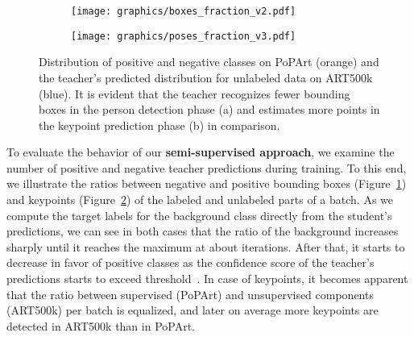 \documentclass[sigconf]{acmart}
\begin{document}
\begin{figure}
\centering
\begin{subfigure}{.49\linewidth}
  \centering
  \texttt{[image: graphics/boxes\_fraction\_v2.pdf]}
  \caption{}
  \label{fig:distribution-boxes}
\end{subfigure}\hfill
\begin{subfigure}{.49\linewidth}
  \centering
  \texttt{[image: graphics/poses\_fraction\_v3.pdf]}
  \caption{}
  \label{fig:distribution-keypoints}
\end{subfigure}\caption{Distribution of positive and negative classes on \ac{PoPArt} (orange) and the teacher's predicted distribution for unlabeled data on ART500k (blue). It is evident that the teacher recognizes fewer bounding boxes in the person detection phase (a) and estimates more points in the keypoint prediction phase (b) in comparison.}
\label{fig:distribution}
\end{figure}

To evaluate the behavior of our \textbf{semi-supervised approach}, we examine the number of positive and negative teacher predictions during training. 
To this end, we illustrate the ratios between negative and positive bounding boxes (Figure~\ref{fig:distribution-boxes}) and keypoints (Figure~\ref{fig:distribution-keypoints}) of the labeled and unlabeled parts of a batch. 
As we compute the target labels for the background class directly from the student's predictions, we can see in both cases that the ratio of the background increases sharply until it reaches the maximum at about  iterations. 
After that, it starts to decrease in favor of positive classes as the confidence score of the teacher's predictions starts to exceed threshold~. 
In case of keypoints, it becomes apparent that the ratio between supervised (\ac{PoPArt}) and unsupervised components (ART500k) per batch is equalized, and later on average more keypoints are detected in ART500k than in \ac{PoPArt}.
\end{document}
